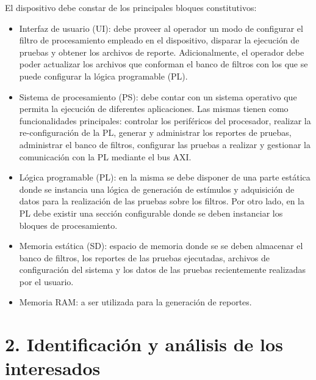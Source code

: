\documentclass[
11pt, %
]{charter}
\begin{document}
El dispositivo debe constar de los principales bloques constitutivos:
\begin{itemize}
	\item Interfaz de usuario (UI): debe proveer al operador un modo de configurar el filtro de procesamiento empleado en el dispositivo, disparar la ejecución de pruebas y obtener los archivos de reporte. Adicionalmente, el operador debe poder actualizar los archivos que conforman el banco de filtros con los que se puede configurar la lógica programable (PL).
	\item Sistema de procesamiento (PS): debe contar con un sistema operativo que permita la ejecución de diferentes aplicaciones. Las mismas tienen como funcionalidades principales: controlar los periféricos del procesador, realizar la re-configuración de la PL, generar y administrar los reportes de pruebas, administrar el banco de filtros, configurar las pruebas a realizar y gestionar la comunicación con la PL mediante el bus AXI.
	\item Lógica programable (PL): en la misma se debe disponer de una parte estática donde se instancia una lógica de generación de estímulos y adquisición de datos para la realización de las pruebas sobre los filtros. Por otro lado, en la PL debe existir una sección configurable donde se deben instanciar los bloques de procesamiento.
	\item Memoria estática (SD): espacio de memoria donde se se deben almacenar el banco de filtros, los reportes de las pruebas ejecutadas, archivos de configuración del sistema y los datos de las pruebas recientemente realizadas por el usuario.
	\item Memoria RAM: a ser utilizada para la generación de reportes.
\end{itemize}

 
\section{2. Identificación y análisis de los interesados}
\label{sec:interesados}
\end{document}
